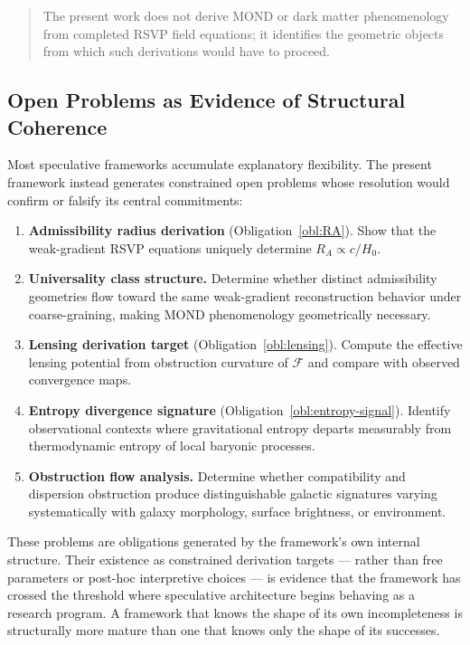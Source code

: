 \documentclass[11pt, a4paper]{article}
\theoremstyle{plain}
\theoremstyle{definition}
\theoremstyle{remark}
\newcommand{\RA}{R_{\!A}}
\newcommand{\sheaf}{\mathcal{F}}
\begin{document}
\begin{quote}
The present work does not derive MOND or dark matter phenomenology from completed
RSVP field equations; it identifies the geometric objects from which such derivations
would have to proceed.
\end{quote}

\subsection{Open Problems as Evidence of Structural Coherence}

Most speculative frameworks accumulate explanatory flexibility. The present framework
instead generates constrained open problems whose resolution would confirm or falsify
its central commitments:

\begin{enumerate}[label=(\arabic*)]
  \item \textbf{Admissibility radius derivation} (Obligation~\ref{obl:RA}). Show
    that the weak-gradient RSVP equations uniquely determine $\RA \propto c/H_0$.
  \item \textbf{Universality class structure.} Determine whether distinct admissibility
    geometries flow toward the same weak-gradient reconstruction behavior under
    coarse-graining, making MOND phenomenology geometrically necessary.
  \item \textbf{Lensing derivation target} (Obligation~\ref{obl:lensing}). Compute
    the effective lensing potential from obstruction curvature of $\sheaf$ and
    compare with observed convergence maps.
  \item \textbf{Entropy divergence signature} (Obligation~\ref{obl:entropy-signal}).
    Identify observational contexts where gravitational entropy departs measurably
    from thermodynamic entropy of local baryonic processes.
  \item \textbf{Obstruction flow analysis.} Determine whether compatibility and
    dispersion obstruction produce distinguishable galactic signatures varying
    systematically with galaxy morphology, surface brightness, or environment.
\end{enumerate}

These problems are obligations generated by the framework's own internal structure.
Their existence as constrained derivation targets --- rather than free parameters or
post-hoc interpretive choices --- is evidence that the framework has crossed the
threshold where speculative architecture begins behaving as a research program. A
framework that knows the shape of its own incompleteness is structurally more mature
than one that knows only the shape of its successes.
\end{document}
